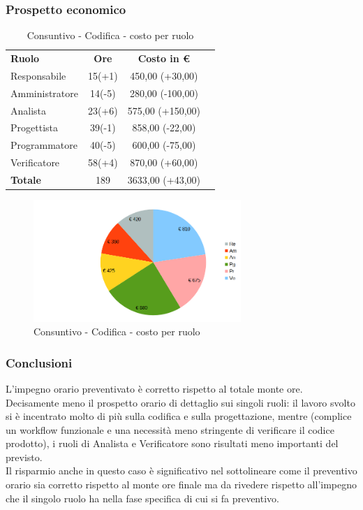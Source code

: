 \subsubsection{Prospetto economico}


\begin{table} [h!]
	\begin{center}
		\begin{tabular} { m{3 cm} c c c  }
			\rowcolor{lightgray}
			\textbf{Ruolo}  & \textbf{Ore} & \textbf{Costo in \euro} \\
			Responsabile    & 15(+1)      & 450,00 (+30,00) \\
			Amministratore  & 14(-5)      & 280,00 (-100,00)  \\
			Analista        & 23(+6)     & 575,00 (+150,00) \\
			Progettista     & 39(-1)          & 858,00 (-22,00) \\
			Programmatore   & 40(-5)        & 600,00 (-75,00) \\
			Verificatore    & 58(+4)        & 870,00 (+60,00) \\
			\textbf{Totale} & 189         & 3633,00 (+43,00) \\
			
		\end{tabular}
		\caption{Consuntivo - Codifica  - costo per ruolo}
	\end{center}
\end{table}
\begin{figure} [h!]
	\centering
	\includegraphics[width=0.7\textwidth]{res/img/grafici/consuntivo-torta-tb.png}
	\caption{Consuntivo - Codifica  - costo per ruolo} 
\end{figure}
\subsubsection{Conclusioni}
L'impegno orario preventivato è corretto rispetto al totale monte ore.\\ Decisamente meno il prospetto orario di dettaglio sui singoli ruoli: il lavoro svolto si è incentrato molto di più sulla codifica e sulla progettazione, mentre (complice un workflow funzionale e una necessità meno stringente di verificare il codice prodotto), i ruoli di Analista e Verificatore sono risultati meno importanti del previsto.\\
Il risparmio anche in questo caso è significativo nel sottolineare come il preventivo orario sia corretto rispetto al monte ore finale ma da rivedere rispetto all'impegno che il singolo ruolo ha nella fase specifica di cui si fa preventivo. \\ 

